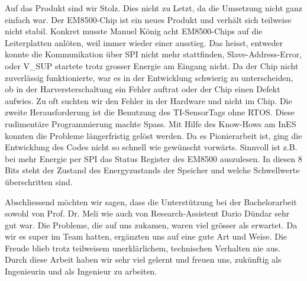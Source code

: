 Auf das Produkt sind wir Stolz. Dies nicht zu Letzt, da die Umsetzung nicht ganz einfach war. Der EM8500-Chip ist ein neues Produkt und verhält sich teilweise nicht stabil. Konkret musste Manuel König acht EM8500-Chips auf die Leiterplatten anlöten, weil immer wieder einer ausstieg. Das heisst, entweder konnte die Kommunikation über SPI nicht mehr stattfinden, Slave-Address-Error, oder V\_SUP startete trotz grosser Energie am Eingang nicht. Da der Chip nicht zuverlässig funktionierte, war es in der Entwicklung schwierig zu unterscheiden, ob in der Harversterschaltung ein Fehler auftrat oder der Chip einen Defekt aufwies. Zu oft suchten wir den Fehler in der Hardware und nicht im Chip. Die zweite Herausforderung ist die Benutzung des TI-SensorTags ohne RTOS. Diese rudimentäre Programmierung machte Spass. Mit Hilfe des Know-Hows am InES konnten die Probleme längerfristig gelöst werden. Da es Pionierarbeit ist, ging die Entwicklung des Codes nicht so schnell wie gewünscht vorwärts. Sinnvoll ist z.B. bei mehr Energie per SPI das Status Register des EM8500 auszulesen. In diesen 8 Bits steht der Zustand des Energyzustands der Speicher und welche Schwellwerte überschritten sind. 

Abschliessend möchten wir sagen, dass die Unterstützung bei der Bachelorarbeit sowohl von Prof. Dr. Meli wie auch von Research-Assistent Dario Dündar sehr gut war. Die Probleme, die auf uns zukamen, waren viel grösser als erwartet. Da wir es super im Team hatten, ergänzten uns auf eine gute Art und Weise. Die Freude blieb trotz teilweisem unerklärlichem, technischen Verhalten nie aus. Durch diese Arbeit haben wir sehr viel gelernt und freuen uns, zukünftig als Ingenieurin und als Ingenieur zu arbeiten.



